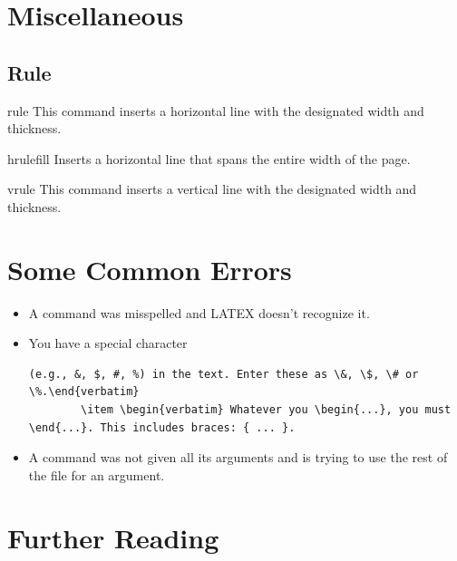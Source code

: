 \section{Miscellaneous}
\vspace{10.5cm}
	\subsection{Rule}
		\begin{docCommand}{rule}{}
				This command inserts a horizontal line with the designated width and thickness.
		\end{docCommand}
		\begin{docCommand}{hrulefill}{}
				Inserts a horizontal line that spans the entire width of the page.
		\end{docCommand}
		\begin{docCommand}{vrule}{}
				This command inserts a vertical line with the designated width and thickness.
		\end{docCommand}
\newpage
\section{Some Common Errors}
\vspace{10.5cm}
	\begin{itemize}
		\item A command was misspelled and LATEX doesn’t recognize it.
		\item You have a special character \begin{verbatim}(e.g., &, $, #, %) in the text. Enter these as \&, \$, \# or \%.\end{verbatim}
		\item \begin{verbatim} Whatever you \begin{...}, you must \end{...}. This includes braces: { ... }.\end{verbatim}
		\item A command was not given all its arguments and is trying to use the rest of the file for an argument.
	\end{itemize}
\newpage
\section{Further Reading}\label{sec:resources}
\vspace{10.5cm}
